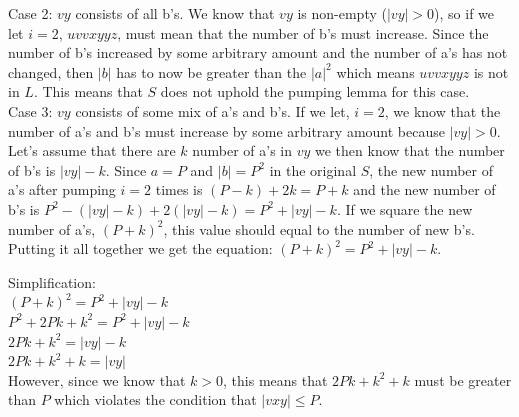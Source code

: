 \documentclass[11pt]{article}
\theoremstyle{definition}
\theoremstyle{theorem}
\begin{document}
\begin{enumerate}[label=(\alph*)]
Case 2: $vy$ consists of all b's. We know that $vy$ is non-empty ($|vy| > 0$), so if we let $i = 2$, $uvvxyyz$, must mean that the number of b's must increase. Since the number of b's increased by some arbitrary amount and the number of a's has not changed, then $|b|$ has to now be greater than the $|a|^2$ which means $uvvxyyz$ is not in $L$. This means that $S$ does not uphold the pumping lemma for this case. \\

Case 3: $vy$ consists of some mix of a's and b's. If we let, $i = 2$, we know that the number of a's and b's must increase by some arbitrary amount because $|vy| > 0$. 
Let's assume that there are $k$ number of a's in $vy$ we then know that the number of b's is $|vy| - k$. Since $a = P$ and $|b| = P^2$ in the original $S$, the new number of a's after pumping $i = 2$ times is $(P - k) + 2k = P + k $ and the new number of b's is $P^2 - (|vy| - k) + 2(|vy| -  k) = P^2 + |vy| - k$. If we square the new number of a's, $(P + k)^2$, this value should equal to the number of new b's. Putting it all together
we get the equation: $(P + k)^2 = P^2 + |vy| - k$. 

Simplification:\\
$(P + k)^2 = P^2 + |vy| - k$\\
$P^2 + 2Pk + k^2 = P^2 + |vy| - k$\\
$2Pk + k^2 = |vy| - k$\\
$2Pk + k^2 + k = |vy|$\\

However, since we know that $k > 0$, this means that $2Pk + k^2 + k$ must be greater than $P$ which violates the condition that $|vxy| \leq P$. 







\end{enumerate}
\end{document}

